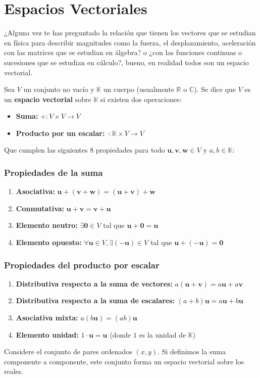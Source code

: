 \section{Espacios Vectoriales}
¿Alguna vez te has preguntado la relación que tienen los vectores que se estudian en física para describir magnitudes como la fuerza, el desplazamiento, aceleración con las matrices que se estudian en álgebra? o ¿con las funciones continuas o sucesiones que se estudian en cálculo?, bueno, en realidad todos son un espacio vectorial.

\begin{definition}
	Sea $V$ un conjunto no vacío y $\mathbb{K}$ un cuerpo (usualmente $\mathbb{R}$ o $\mathbb{C}$). Se dice que $V$ es un \textbf{espacio vectorial} sobre $\mathbb{K}$ si existen dos operaciones:
	\begin{itemize}
		\item \textbf{Suma:} $+: V \times V \to V$
		\item \textbf{Producto por un escalar:} $\cdot: \mathbb{K} \times V \to V$
	\end{itemize}
	
	Que cumplen las siguientes 8 propiedades para todo $\mathbf{u}, \mathbf{v}, \mathbf{w} \in V$ y $a, b \in \mathbb{K}$:
	
	\subsubsection*{Propiedades de la suma}
	\begin{enumerate}
		\item \textbf{Asociativa:} $\mathbf{u} + (\mathbf{v} + \mathbf{w}) = (\mathbf{u} + \mathbf{v}) + \mathbf{w}$
		\item \textbf{Conmutativa:} $\mathbf{u} + \mathbf{v} = \mathbf{v} + \mathbf{u}$
		\item \textbf{Elemento neutro:} $\exists \mathbf{0} \in V$ tal que $\mathbf{u} + \mathbf{0} = \mathbf{u}$
		\item \textbf{Elemento opuesto:} $\forall \mathbf{u} \in V, \exists (-\mathbf{u}) \in V$ tal que $\mathbf{u} + (-\mathbf{u}) = \mathbf{0}$
	\end{enumerate}
	
	\subsubsection*{Propiedades del producto por escalar}
	\begin{enumerate}
		\item \textbf{Distributiva respecto a la suma de vectores:} $a(\mathbf{u} + \mathbf{v}) = a\mathbf{u} + a\mathbf{v}$
		\item \textbf{Distributiva respecto a la suma de escalares:} $(a + b)\mathbf{u} = a\mathbf{u} + b\mathbf{u}$
		\item \textbf{Asociativa mixta:} $a(b\mathbf{u}) = (ab)\mathbf{u}$
		\item \textbf{Elemento unidad:} $1 \cdot \mathbf{u} = \mathbf{u}$ (donde $1$ es la unidad de $\mathbb{K}$)
	\end{enumerate}
\end{definition}
\begin{ejemplo}[$\mathbb{R}^2$]
	Considere el conjunto de pares ordenados $(x, y)$. Si definimos la suma componente a componente, este conjunto forma un espacio vectorial sobre los reales.
\end{ejemplo}